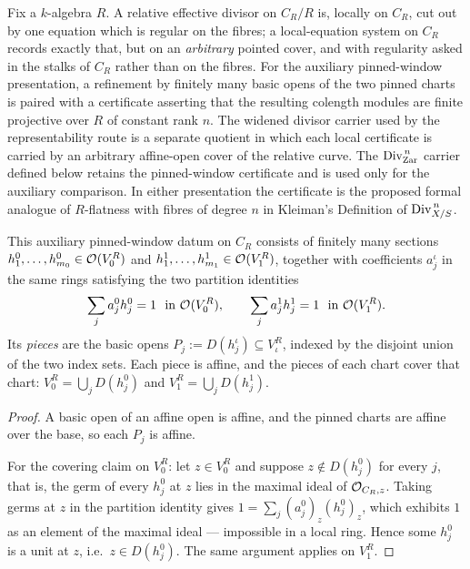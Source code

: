 Fix a \(k\)-algebra \(R\). A relative effective divisor on \(C_R/R\) is, locally on
\(C_R\), cut out by one equation which is regular on the fibres; a local-equation system on
\(C_R\) records exactly that, but on an \emph{arbitrary} pointed cover, and with regularity
asked in the stalks of \(C_R\) rather than on the fibres.  For the auxiliary pinned-window
presentation, a refinement by finitely many basic opens of the two pinned charts is paired
with a certificate asserting that the resulting colength modules are finite projective over
\(R\) of constant rank \(n\).  The widened divisor carrier used by the representability route
is a separate quotient in which each local certificate is carried by an arbitrary affine-open
cover of the relative curve.  The \(\operatorname{Div}^{\,n}_{\mathrm{Zar}}\) carrier defined below retains
the pinned-window certificate and is used only for the auxiliary comparison.
In either presentation the certificate is the proposed formal
analogue of \(R\)-flatness with fibres of degree \(n\) in Kleiman's Definition of
\(\operatorname{Div}^{\,n}_{X/S}\).

\begin{definition}
  \label{pa-def:finCoverData}
  \leanok

  This auxiliary pinned-window datum on \(C_R\) consists of finitely many sections
  \(h^0_1,\dots,h^0_{m_0} \in \mathcal{O}_{}(V_0^R)\) and \(h^1_1,\dots,h^1_{m_1} \in
  \mathcal{O}_{}(V_1^R)\), together with coefficients \(a^\iota_j\) in the same rings satisfying
  the two partition identities
  \[
    \sum_{j} a^0_j h^0_j = 1 \ \text{ in } \mathcal{O}_{}(V_0^R), \qquad
    \sum_{j} a^1_j h^1_j = 1 \ \text{ in } \mathcal{O}_{}(V_1^R).
  \]
  Its \emph{pieces} are the basic opens \(P_j := D(h^\iota_j) \subseteq V_\iota^R\), indexed
  by the disjoint union of the two index sets. Each piece is affine, and the pieces of each
  chart cover that chart:
  \(V_0^R = \bigcup_j D(h^0_j)\) and \(V_1^R = \bigcup_j D(h^1_j)\).
\end{definition}
\begin{proof}
  \leanok
  A basic open of an affine open is affine, and the pinned charts are affine over the
  base, so each \(P_j\) is affine.

  For the covering claim on \(V_0^R\): let \(z \in V_0^R\) and suppose \(z \notin D(h^0_j)\)
  for every \(j\), that is, the germ of every \(h^0_j\) at \(z\) lies in the maximal ideal
  of \(\mathcal{O}_{C_R, z}\). Taking germs at \(z\) in the partition identity gives
  \(1 = \sum_j (a^0_j)_z (h^0_j)_z\), which exhibits \(1\) as an element of the maximal
  ideal --- impossible in a local ring. Hence some \(h^0_j\) is a unit at \(z\), i.e.\
  \(z \in D(h^0_j)\). The same argument applies on \(V_1^R\).
\end{proof}

